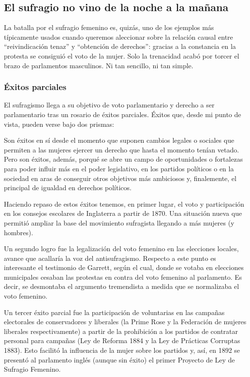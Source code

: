 \documentclass[
]{article}
\begin{document}
\hypertarget{el-sufragio-no-vino-de-la-noche-a-la-mauxf1ana}{%
\subsection{El sufragio no vino de la noche a la
mañana}\label{el-sufragio-no-vino-de-la-noche-a-la-mauxf1ana}}

La batalla por el sufragio femenino es, quizás, uno de los ejemplos más
típicamente usados cuando queremos aleccionar sobre la relación causal
entre ``reivindicación tenaz'' y ``obtención de derechos'': gracias a la
constancia en la protesta se consiguió el voto de la mujer. Solo la
trenacidad acabó por torcer el brazo de parlamentos masculinos. Ni tan
sencillo, ni tan simple.

\hypertarget{uxe9xitos-parciales}{%
\subsubsection{Éxitos parciales}\label{uxe9xitos-parciales}}

El sufragismo llega a su objetivo de voto parlamentario y derecho a ser
parlamentario tras un rosario de éxitos parciales. Éxitos que, desde mi
punto de vista, pueden verse bajo dos prismas:

Son éxitos en sí desde el momento que suponen cambios legales o sociales
que permiten a las mujeres ejercer un derecho que hasta el momento
tenían vetado. Pero son éxitos, además, porqué se abre un campo de
oportunidades o fortalezas para poder influir más en el poder
legislativo, en los partidos políticos o en la sociedad en aras de
conseguir otros objetivos más ambiciosos y, finalemente, el principal de
igualdad en derechos políticos.

Haciendo repaso de estos éxitos tenemos, en primer lugar, el voto y
participación en los consejos escolares de Inglaterra a partir de 1870.
Una situación nueva que permitió ampliar la base del movimiento
sufragista llegando a más mujeres (y hombres).

Un segundo logro fue la legalización del voto femenino en las elecciones
locales, avance que acallaría la voz del antisufragismo. Respecto a este
punto es interesante el testimonio de Garrett, según el cual, donde se
votaba en elecciones municipales cesaban las protestas en contra del
voto femenino al parlamento. Es decir, se desmontaba el argumento
tremendista a medida que se normalizaba el voto femenino.

Un tercer éxito parcial fue la participación de voluntarias en las
campañas electorales de conservadores y liberales (la Prime Rose y la
Federación de mujeres liberales respectivamente) a partir de la
prohibición a los partidos de contratar personal para campañas (Ley de
Reforma 1884 y la Ley de Prácticas Corruptas 1883). Esto facilitó la
influencia de la mujer sobre los partidos y, así, en 1892 se presentó al
parlamento inglés (aunque sin éxito) el primer Proyecto de Ley de
Sufragio Femenino.
\end{document}

